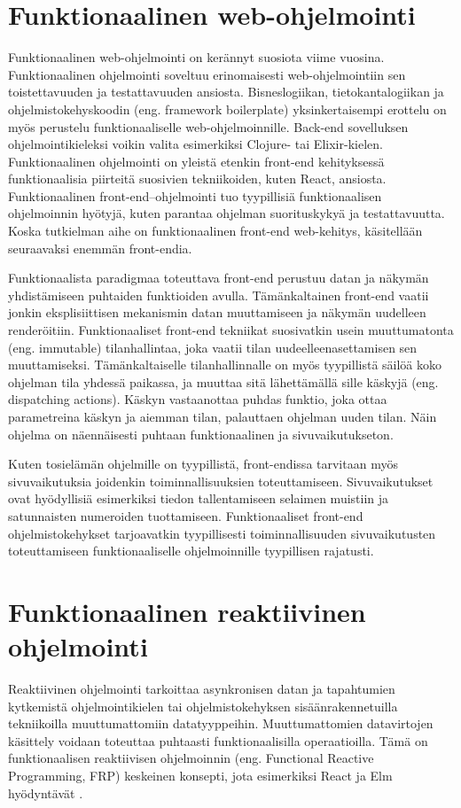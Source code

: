 \section{Funktionaalinen web-ohjelmointi}
Funktionaalinen web-ohjelmointi on kerännyt suosiota viime vuosina. Funktionaalinen ohjelmointi soveltuu erinomaisesti
web-ohjelmointiin sen toistettavuuden ja testattavuuden ansiosta. Bisneslogiikan, tietokantalogiikan ja
ohjelmistokehyskoodin (eng. framework boilerplate) yksinkertaisempi erottelu on myös perustelu funktionaaliselle
web-ohjelmoinnille. Back-end sovelluksen ohjelmointikieleksi voikin valita esimerkiksi Clojure- tai Elixir-kielen.
\cite{functionalwebdev} Funktionaalinen ohjelmointi on yleistä etenkin front-end kehityksessä funktionaalisia piirteitä
suosivien tekniikoiden, kuten React, ansiosta. Funktionaalinen front-end–ohjelmointi tuo tyypillisiä funktionaalisen
ohjelmoinnin hyötyjä, kuten parantaa ohjelman suorituskykyä ja testattavuutta. \cite{functionalreact} Koska tutkielman
aihe on funktionaalinen front-end web-kehitys, käsitellään seuraavaksi enemmän front-endia.

Funktionaalista paradigmaa toteuttava front-end perustuu datan ja näkymän yhdistämiseen puhtaiden funktioiden avulla.
Tämänkaltainen front-end vaatii jonkin eksplisiittisen mekanismin datan muuttamiseen ja näkymän uudelleen renderöitiin.
Funktionaaliset front-end tekniikat suosivatkin usein muuttumatonta (eng. immutable) tilanhallintaa, joka vaatii tilan
uudeelleenasettamisen sen muuttamiseksi. Tämänkaltaiselle tilanhallinnalle on myös tyypillistä säilöä koko ohjelman tila
yhdessä paikassa, ja muuttaa sitä lähettämällä sille käskyjä (eng. dispatching actions). Käskyn vastaanottaa puhdas
funktio, joka ottaa parametreina käskyn ja aiemman tilan, palauttaen ohjelman uuden tilan. Näin ohjelma on näennäisesti
puhtaan funktionaalinen ja sivuvaikutukseton. \cite{functionalreact}

Kuten tosielämän ohjelmille on tyypillistä, front-endissa tarvitaan myös sivuvaikutuksia joidenkin toiminnallisuuksien
toteuttamiseen. Sivuvaikutukset ovat hyödyllisiä esimerkiksi tiedon tallentamiseen selaimen muistiin ja satunnaisten
numeroiden tuottamiseen. Funktionaaliset front-end ohjelmistokehykset tarjoavatkin tyypillisesti toiminnallisuuden
sivuvaikutusten toteuttamiseen funktionaaliselle ohjelmoinnille tyypillisen rajatusti. \cite{elmlang}\cite{reactjs}

\section{Funktionaalinen reaktiivinen ohjelmointi}
Reaktiivinen ohjelmointi tarkoittaa asynkronisen datan ja tapahtumien kytkemistä ohjelmointikielen tai
ohjelmistokehyksen sisäänrakennetuilla tekniikoilla muuttumattomiin datatyyppeihin. Muuttumattomien datavirtojen 
käsittely voidaan toteuttaa puhtaasti funktionaalisilla operaatioilla. Tämä on funktionaalisen reaktiivisen ohjelmoinnin
(eng. Functional Reactive Programming, FRP) keskeinen konsepti, jota esimerkiksi React ja Elm hyödyntävät
\cite{elmlang}\cite{reactjs}. \cite{fpmattered}

